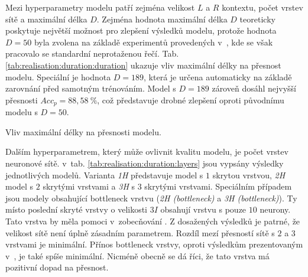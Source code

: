 Mezi hyperparametry modelu patří zejména velikost $L$ a $R$ kontextu, počet vrstev sítě a maximální délka $D$. Zejména hodnota maximální délka $D$ teoreticky poskytuje největší možnost pro zlepšení výsledků modelu, protože hodnota $D=50$ byla zvolena na základě experimentů provedených v~\cite{Hadian2017}, kde se však pracovalo se standardní neprotaženou řečí. Tab. \ref{tab:realisation:duration:duration} ukazuje vliv maximální délky na přesnost modelu. Speciální je hodnota $D=189$, která je určena automaticky na základě zarovnání před samotným trénováním. Model s $D=189$ zároveň dosáhl nejvyšší přesnosti $Acc_{p} = 88,58\ \%$, což představuje drobné zlepšení oproti původnímu modelu s $D = 50$.

\begin{table}[htpb]
  \centering
  \def\arraystretch{1.5}
  \caption{Vliv maximální délky na přesnosti modelu.}
  \label{tab:realisation:duration:duration}
\end{table}

Dalším hyperparametrem, který může ovlivnit kvalitu modelu, je počet vrstev neuronové sítě. v~tab. \ref{tab:realisation:duration:layers} jsou vypsány výsledky jednotlivých modelů. Varianta \textit{1H} představuje model s $1$ skrytou vrstvou, \textit{2H} model s $2$ skrytými vrstvami a \textit{3H} s $3$ skrytými vrstvami. Speciálním případem jsou modely obsahující bottleneck vrstvu (\textit{2H (bottleneck)} a \textit{3H (bottleneck)}). Ty místo poslední skryté vrstvy o velikosti $3I$ obsahují vrstvu s pouze $10$ neurony. Tato vrstva by měla pomoci v~zobecňování \cite{Hadian2017}. Z dosažených výsledků je patrné, že velikost sítě není úplně zásadním parametrem. Rozdíl mezí přesností sítě s $2$ a $3$ vrstvami je minimální. Přínos bottleneck vrstvy, oproti výsledkům prezentovaným v~\cite{Hadian2017}, je také spíše minimální. Nicméně obecně se dá říci, že tato vrstva má pozitivní dopad na přesnost.

